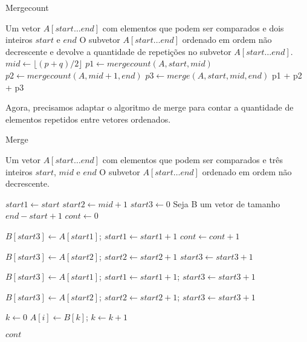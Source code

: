 \begin{algorithm}
\caption{Mergecount}
\label{alg::mergecount}

\begin{algorithmic}
\Require Um vetor $A[start \ldots end]$ com elementos que podem ser comparados e dois inteiros $start$ e $end$
\Ensure O subvetor $A[start \ldots end]$ ordenado em ordem não decrescente e devolve a quantidade de repetições no subvetor $A[start \ldots end]$.
    \State $mid \gets \lfloor (p+q)/2 \rfloor$
    \State $p1 \gets mergecount(A, start, mid )$
    \State $p2 \gets mergecount(A, mid + 1, end )$
    \State $p3 \gets merge(A, start, mid, end)$
    \State \Return p1 + p2 + p3
\Else
    \State {}
\EndIf
\end{algorithmic}
\end{algorithm}

Agora, precisamos adaptar o algoritmo de merge para contar a quantidade de elementos repetidos entre vetores ordenados.

\begin{algorithm}[!h]
\caption{Merge}
\label{alg::merge}

\begin{algorithmic}
\Require Um vetor $A[start \ldots end]$ com elementos que podem ser comparados e três inteiros $start$, $mid$ e $end$
\Ensure O subvetor $A[start \ldots end]$ ordenado em ordem não decrescente.

\State $start1 \gets start$
\State $start2 \gets mid+1$
\State $start3 \gets 0$
\State Seja B um vetor de tamanho $end-start+1$
\State $cont \gets 0$



\State $B[start3] \gets A[start1]$; $start1 \gets start1 + 1$
\Else 
{}
\State $cont \gets cont + 1$

\EndIf

\State $B[start3] \gets A[start2]$; $start2 \gets start2 + 1$
\EndIf
\State $start3 \gets start3 + 1$
\EndWhile

\State $B[start3] \gets A[start1]$; $start1 \gets start1 + 1$; $start3 \gets start3 + 1$
\EndWhile 

\State $B[start3] \gets A[start2]$; $start2 \gets start2 + 1$; $start3 \gets start3 + 1$
\EndWhile 

\State $k \gets 0$
\State $A[i] \gets B[k]$; $k \gets k + 1$
\EndFor

\State \Return $cont$


\end{algorithmic}
\end{algorithm}


